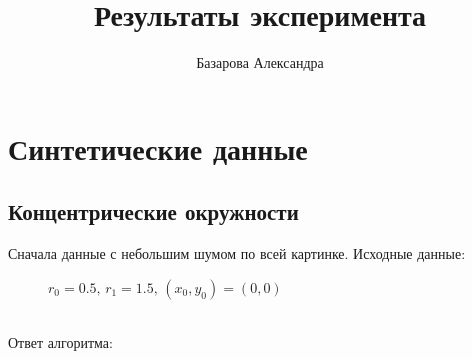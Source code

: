 \documentclass[12pt,twoside]{article}
\title{Результаты эксперимента}
\author{Базарова Александра}
\begin{document}
\maketitle
\section{Синтетические данные}
\subsection{Концентрические окружности}
Сначала данные с небольшим шумом по всей картинке. Исходные данные:  \begin{figure}[h]
\caption{$r_0 = 0.5, \, r_1 = 1.5, \, (x_0, y_0) = (0, 0)$}
\end{figure} \\
Ответ алгоритма: \\
\begin{figure}[h]
\end{figure}\\
\end{document}
